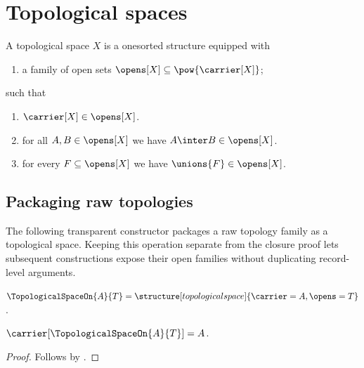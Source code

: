 


\section{Topological spaces}\label{form_sec_topospaces}

\begin{struct}\label{topological_space}
    A topological space $X$ is a onesorted structure equipped with
    \begin{enumerate}
        \item\label{opens_family}
            a family of open sets
            $\opens[X]\subseteq\pow{\carrier[X]}$;
    \end{enumerate}
    such that
    \begin{enumerate}
        \item\label{carrier_open}
            $\carrier[X]\in\opens[X]$.
        \item\label{opens_inter}
            for all $A,B\in\opens[X]$ we have
                $A\inter B\in\opens[X]$.
        \item\label{opens_unions}
            for every $F\subseteq\opens[X]$ we have
                $\unions{F}\in\opens[X]$.
    \end{enumerate}
\end{struct}

\subsection{Packaging raw topologies}

The following transparent constructor packages a raw topology family as a
topological space.  Keeping this operation separate from the closure proof
lets subsequent constructions expose their open families without duplicating
record-level arguments.

\begin{definition}\label{topological_space_on}
    $\TopologicalSpaceOn{A}{T}=
        \structure[topological space]{
            \carrier=A,
            \opens=T
        }$.
\end{definition}

\begin{proposition}\label{topological_space_on_carrier}
    $\carrier[\TopologicalSpaceOn{A}{T}]=A$.
\end{proposition}
\begin{proof}
    Follows by
        .
\end{proof}

